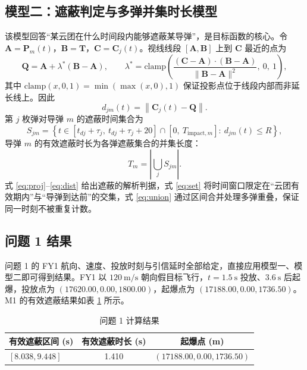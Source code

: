 \documentclass[11pt,a4paper]{ctexart}
\begin{document}
\subsection{模型二：遮蔽判定与多弹并集时长模型}

该模型回答“某云团在什么时间段内能够遮蔽某导弹”，是目标函数的核心。令 $\bm{A}=\bm{P}_m(t)$，$\bm{B}=\bm{T}$，$\bm{C}=\bm{C}_j(t)$。视线线段 $[\bm{A},\bm{B}]$ 上到 $\bm{C}$ 最近的点为
\begin{equation}
  \bm{Q}=\bm{A}+\lambda^*(\bm{B}-\bm{A}),\qquad
  \lambda^*=\mathrm{clamp}\!\left(\frac{(\bm{C}-\bm{A})\cdot(\bm{B}-\bm{A})}
  {\|\bm{B}-\bm{A}\|^2},\ 0,\ 1\right),
  \label{eq:proj}
\end{equation}
其中 $\mathrm{clamp}(x,0,1)=\min(\max(x,0),1)$ 保证投影点位于线段内部而非延长线上。因此
\begin{equation}
  d_{jm}(t)=\left\|\bm{C}_j(t)-\bm{Q}\right\|.
  \label{eq:dist}
\end{equation}
第 $j$ 枚弹对导弹 $m$ 的遮蔽时间集合为
\begin{equation}
  S_{jm}=\left\{t\in\left[t_{dj}+\tau_j,\ t_{dj}+\tau_j+20\right]\cap
  \left[0,\ T_{\mathrm{impact},m}\right]:\ d_{jm}(t)\le R\right\},
  \label{eq:set}
\end{equation}
导弹 $m$ 的有效遮蔽时长为各弹遮蔽集合的并集长度：
\begin{equation}
  T_m=\left|\bigcup_{j} S_{jm}\right|.
  \label{eq:union}
\end{equation}
式 \eqref{eq:proj}--\eqref{eq:dist} 给出遮蔽的解析判据，式 \eqref{eq:set} 将时间窗口限定在“云团有效期内”与“导弹到达前”的交集，式 \eqref{eq:union} 通过区间合并处理多弹重叠，保证同一时刻不被重复计数。

\subsection{问题 1 结果}

问题 1 的 FY1 航向、速度、投放时刻与引信延时全部给定，直接应用模型一、模型二即可得到结果。FY1 以 $120~\mathrm{m/s}$ 朝向假目标飞行，$t=1.5~\mathrm{s}$ 投放、$3.6~\mathrm{s}$ 后起爆，投放点为 $(17620.00,\allowbreak 0.00,\allowbreak 1800.00)$，起爆点为 $(17188.00,\allowbreak 0.00,\allowbreak 1736.50)$。M1 的有效遮蔽结果如表 \ref{tab:q1res} 所示。

\begin{table}[H]
\centering
\caption{问题 1 计算结果}
\label{tab:q1res}
\begin{tabular}{lcc}
\toprule
有效遮蔽区间 (s) & 有效遮蔽时长 (s) & 起爆点 (m) \\
\midrule
$[8.038,9.448]$ & 1.410 & $(17188.00,0.00,1736.50)$ \\
\bottomrule
\end{tabular}
\end{table}
\end{document}

